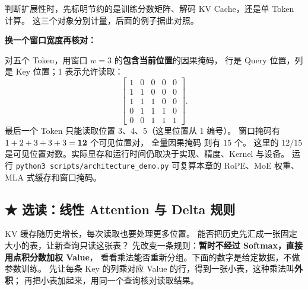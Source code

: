 判断扩展性时，先标明节约的是训练分数矩阵、解码 KV Cache，还是单 Token 计算。
这三个对象分别计量，后面的例子据此对照。

\noindent\textbf{换一个窗口宽度再核对：}\par
对五个 Token，用窗口 $w=3$ 的\textbf{包含当前位置}的因果掩码，
行是 Query 位置，列是 Key 位置；1 表示允许读取：
\[
\boxed{\begin{bmatrix}
1&0&0&0&0\\
1&1&0&0&0\\
1&1&1&0&0\\
0&1&1&1&0\\
0&0&1&1&1
\end{bmatrix}}.
\]
最后一个 Token 只能读取位置 3、4、5（这里位置从 1 编号）。
窗口掩码有 $1+2+3+3+3=\boldsymbol{12}$ 个可见位置对，
全量因果掩码 则有 $15$ 个。
这里的 $12/15$ 是可见位置对数。实际显存和运行时间仍取决于实现、精度、Kernel 与设备。
运行 \texttt{python3 scripts/architecture\_demo.py} 可复算本章的 RoPE、MoE 权重、MLA 式缓存和窗口掩码。

\subsection{\texorpdfstring{{\symboliconfont ★}}{★} 选读：线性 Attention 与 Delta 规则}
\label{sec:modern-linear-state}
\label{concept:linear-attention}

KV 缓存随历史增长，每次读取也要处理更多位置。
能否把历史先汇成一张固定大小的表，让新查询只读这张表？
先改变一条规则：\textbf{暂时不经过 Softmax，直接用点积分数加权 Value}，
看看乘法能否重新分组。下面的数字是给定数据，不做参数训练。
先让每条 Key 的列乘对应 Value 的行，得到一张小表，这种乘法叫\textbf{外积}；
再把小表加起来，用同一个查询核对读取结果。

